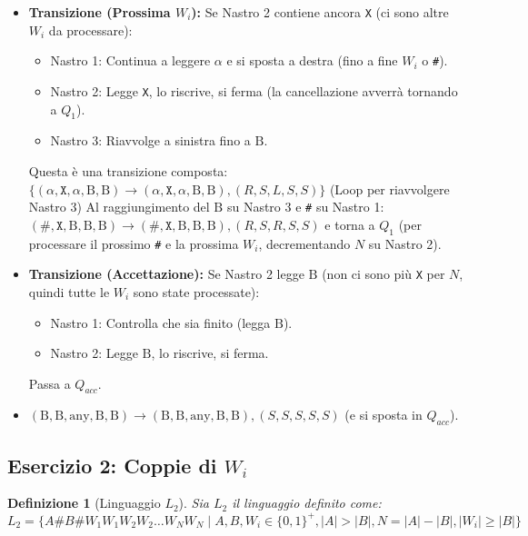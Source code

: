 \documentclass[a4paper, 11pt]{book} %
\newtheorem{definition}[theorem]{Definizione}
\theoremstyle{definition}
\newcommand{\B}{\text{B}} %
\begin{document}
\begin{itemize}
        \begin{itemize}
            \item \textbf{Transizione (Prossima $W_i$):}
                Se Nastro 2 contiene ancora \texttt{X} (ci sono altre $W_i$ da processare):
                \begin{itemize}
                    \item Nastro 1: Continua a leggere $\alpha$ e si sposta a destra (fino a fine $W_i$ o \texttt{\#}).
                    \item Nastro 2: Legge \texttt{X}, lo riscrive, si ferma (la cancellazione avverrà tornando a $Q_1$).
                    \item Nastro 3: Riavvolge a sinistra fino a $\B$.
                \end{itemize}
                Questa è una transizione composta:
                $\{ (\alpha, \texttt{X}, \alpha, \B, \B) \to (\alpha, \texttt{X}, \alpha, \B, \B), (R,S,L,S,S) \}$ (Loop per riavvolgere Nastro 3)
                Al raggiungimento del $\B$ su Nastro 3 e \texttt{\#} su Nastro 1:
                $(\texttt{\#}, \texttt{X}, \B, \B, \B) \to (\texttt{\#}, \texttt{X}, \B, \B, \B), (R,S,R,S,S)$ e torna a $Q_1$ (per processare il prossimo \texttt{\#} e la prossima $W_i$, decrementando $N$ su Nastro 2).
            \item \textbf{Transizione (Accettazione):}
                Se Nastro 2 legge $\B$ (non ci sono più \texttt{X} per $N$, quindi tutte le $W_i$ sono state processate):
                \begin{itemize}
                    \item Nastro 1: Controlla che sia finito (legga $\B$).
                    \item Nastro 2: Legge $\B$, lo riscrive, si ferma.
                \end{itemize}
                Passa a $Q_{acc}$.
                \item $(\B, \B, \text{any}, \B, \B) \to (\B, \B, \text{any}, \B, \B), (S,S,S,S,S)$ (e si sposta in $Q_{acc}$).
        \end{itemize}
\end{itemize}

\subsection{Esercizio 2: Coppie di $W_i$}

\begin{definition}[Linguaggio $L_2$]
Sia $L_2$ il linguaggio definito come:
$L_2 = \{ A\texttt{\#}B\texttt{\#}W_1 W_1 W_2 W_2 \dots W_N W_N \mid A, B, W_i \in \{0,1\}^+, |A| > |B|, N = |A| - |B|, |W_i| \ge |B| \}$
\end{definition}
\end{document}
